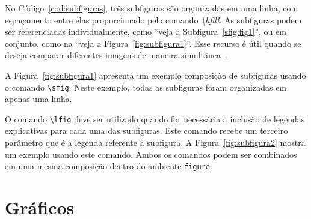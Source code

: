 No Código~\ref{cod:subfiguras}, três subfiguras são organizadas em uma linha, com espaçamento entre elas proporcionado pelo comando \textit{\textbackslash hfill}. As subfiguras podem ser referenciadas individualmente, como ``veja a Subfigura~\ref{sfig:fig1}'', ou em conjunto, como na ``veja a Figura~\ref{fig:subfigura1}''. Esse recurso é útil quando se deseja comparar diferentes imagens de maneira simultânea~\cite{goossens1997latex}.

A Figura~\ref{fig:subfigura1} apresenta um exemplo composição de subfiguras usando o comando \texttt{\textbackslash sfig}. Neste exemplo, todas as subfiguras foram organizadas em apenas uma linha.

\begin{figure}[htb]
    \hfil
    \hfil
    \hfil
\end{figure}

O comando \texttt{\textbackslash lfig} deve ser utilizado quando for necessária a inclusão de legendas explicativas para cada uma das subfiguras. Este comando recebe um terceiro parâmetro que é a legenda referente a subfigura. A Figura~\ref{fig:subfigura2} mostra um exemplo usando este comando. Ambos os comandos podem ser combinados em uma mesma composição dentro do ambiente \texttt{figure}.

\begin{figure}[htb]
    \hfil
    \hfil

    \hfil
    \hfil
\end{figure}

\section{Gráficos}

